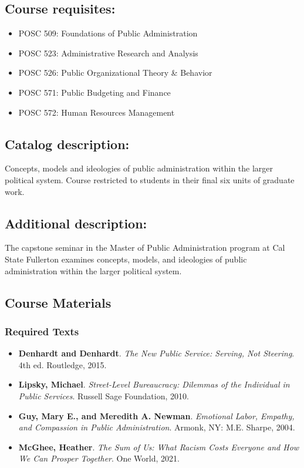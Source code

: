 \documentclass[12pt]{article}     %
\begin{document}
	\subsection*{Course requisites:}
		\begin{itemize}
            \item POSC 509: Foundations of Public Administration
            \item POSC 523: Administrative Research and Analysis
            \item POSC 526: Public Organizational Theory \& Behavior
            \item POSC 571: Public Budgeting and Finance
            \item POSC 572: Human Resources Management
		\end{itemize}

	\subsection*{Catalog description:} 
		Concepts, models and ideologies of public administration within the larger political system. Course restricted to students in their final six units of graduate work.

	\subsection*{Additional description:}
		The capstone seminar in the Master of Public Administration program at Cal State Fullerton examines concepts, models, and ideologies of public administration within the larger political system.


	\subsection*{Course Materials}
	\subsubsection*{Required Texts}
    \begin{itemize}
        \item \textbf{Denhardt and Denhardt}. \textit{The New Public Service: Serving, Not Steering}. 4th ed. Routledge, 2015.
        \item \textbf{Lipsky, Michael}. \textit{Street-Level Bureaucracy: Dilemmas of the Individual in Public Services}. Russell Sage Foundation, 2010.
        \item \textbf{Guy, Mary E., and Meredith A. Newman}. \textit{Emotional Labor, Empathy, and Compassion in Public Administration}. Armonk, NY: M.E. Sharpe, 2004.
        \item \textbf{McGhee, Heather}. \textit{The Sum of Us: What Racism Costs Everyone and How We Can Prosper Together}. One World, 2021.
    \end{itemize}
\end{document}
